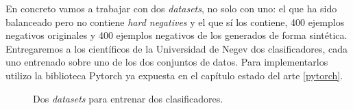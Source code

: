 En concreto vamos a trabajar con dos \textit{datasets}, no solo con uno: el que ha sido balanceado pero no contiene \textit{hard negatives} y el que sí los contiene, 400 ejemplos negativos originales y 400 ejemplos negativos de los generados de forma sintética. Entregaremos a los científicos de la Universidad de Negev dos clasificadores, cada uno entrenado sobre uno de los dos conjuntos de datos. Para implementarlos utilizo la biblioteca Pytorch ya expuesta en el capítulo estado del arte \ref{pytorch}.

\begin{figure}[H]
\centering
    \caption{Dos \textit{datasets} para entrenar dos clasificadores.} 
    \label{fig:two_final_datasets}
\end{figure}

